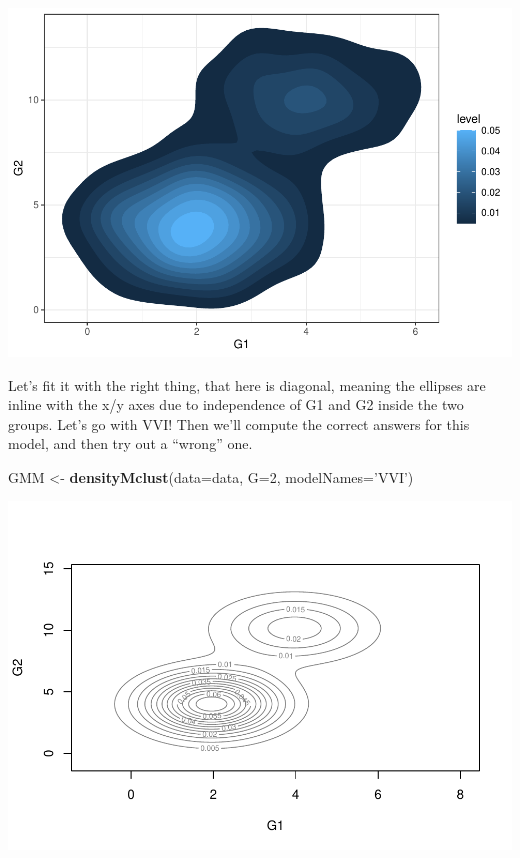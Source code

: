 \documentclass[]{article}
\newenvironment{Shaded}{\begin{snugshade}}{\end{snugshade}}
\newcommand{\DataTypeTok}[1]{\textcolor[rgb]{0.13,0.29,0.53}{#1}}
\newcommand{\DecValTok}[1]{\textcolor[rgb]{0.00,0.00,0.81}{#1}}
\newcommand{\KeywordTok}[1]{\textcolor[rgb]{0.13,0.29,0.53}{\textbf{#1}}}
\newcommand{\NormalTok}[1]{#1}
\newcommand{\StringTok}[1]{\textcolor[rgb]{0.31,0.60,0.02}{#1}}
\begin{document}
\includegraphics{covariance_gmm_files/figure-latex/data_ex_1-1.pdf}

Let's fit it with the right thing, that here is diagonal, meaning the
ellipses are inline with the x/y axes due to independence of G1 and G2
inside the two groups. Let's go with VVI! Then we'll compute the correct
answers for this model, and then try out a ``wrong'' one.

\begin{Shaded}
\begin{Highlighting}[]
\NormalTok{GMM <-}\StringTok{ }\KeywordTok{densityMclust}\NormalTok{(}\DataTypeTok{data=}\NormalTok{data, }\DataTypeTok{G=}\DecValTok{2}\NormalTok{, }\DataTypeTok{modelNames=}\StringTok{'VVI'}\NormalTok{)}
\end{Highlighting}
\end{Shaded}

\includegraphics{covariance_gmm_files/figure-latex/fitdiag_ex1-1.pdf}
\end{document}
